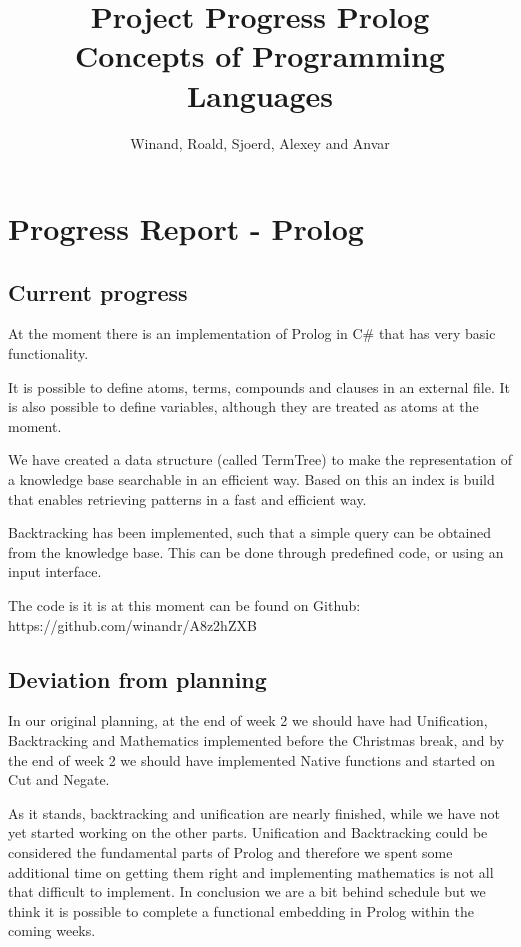 \documentclass[a4paper]{article}
\title{Project Progress Prolog\\
\vspace{1em}
\large Concepts of Programming Languages
}
\author{Winand, Roald, Sjoerd, Alexey and Anvar}
\begin{document}
\section*{Progress Report - Prolog}

\subsection*{Current progress}
At the moment there is an implementation of Prolog in C\# that has very basic functionality.

It is possible to define atoms, terms, compounds and clauses in an external file. It is also possible to define variables, although they are treated as atoms at the moment.

We have created a data structure (called TermTree) to make the representation of a knowledge base searchable in an efficient way. Based on this an index is build that enables retrieving patterns in a fast and efficient way.

Backtracking has been implemented, such that a simple query can be obtained from the knowledge base. This can be done through predefined code, or using an input interface.

The code is it is at this moment can be found on Github: https://github.com/winandr/A8z2hZXB

\subsection*{Deviation from planning}

In our original planning, at the end of week 2 we should have had Unification, Backtracking and Mathematics implemented before the Christmas break, and by the end of week 2 we should have implemented Native functions and started on Cut and Negate.

As it stands, backtracking and unification are nearly finished, while we have not yet started working on the other parts. Unification and Backtracking could be considered the fundamental parts of Prolog and therefore we spent some additional time on getting them right and implementing mathematics is not all that difficult to implement. In conclusion we are a bit behind schedule but we think it is possible to complete a functional embedding in Prolog within the coming weeks.
\end{document}
